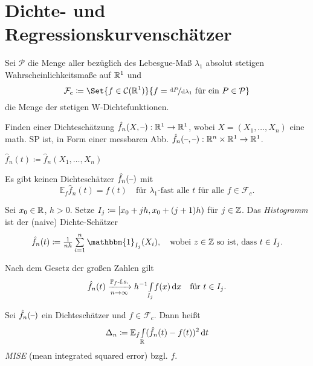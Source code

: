 \documentclass{cheat-sheet}
\renewcommand{\P}{\mathbb{P}} %
\newcommand{\E}{\mathbb{E}} %
\newcommand{\ind}{\mathbbm{1}} %
\newcommand{\Cont}{\mathcal{C}} %
\begin{document}

\iffalse

\section{Dichte- und Regressionskurvenschätzer}


\begin{nota}
  Sei $\mathcal{P}$ die Menge aller bezüglich des Lebesgue-Maß $\lambda_1$ absolut stetigen Wahrscheinlichkeitsmaße auf $\mathbb{R}^1$ und
  \[ \mathcal{F}_c \coloneqq \Set{f \in \Cont(\R^1)}{f = \nicefrac{\d P}{\d \lambda_1} \text{ für ein } P \in \mathcal{P}} \]
  die Menge der stetigen W-Dichtefunktionen.
\end{nota}

\begin{ziel}
  Finden einer Dichteschätzung $\hat{f}_n(X, \text{--}) : \mathbb{R}^1 \to \mathbb{R}^1$, wobei $X = (X_1, \ldots, X_n)$ eine math. SP ist, in Form einer messbaren Abb. $\hat{f}_n(\text{--}, \text{--}) : \mathbb{R}^n \times \mathbb{R}^1 \to \mathbb{R}^1$.
\end{ziel}

\begin{nota}
  $\hat{f}_n(t) \coloneqq \hat{f}_n(X_1, \ldots, X_n)$
\end{nota}

\begin{lem}
  Es gibt keinen Dichteschätzer $\hat{f}_n(\text{--})$ mit
  \[
    \E_f \hat{f}_n(t) = f(t) \quad
    \text{für $\lambda_1$-fast alle $t$ für alle $f \in \mathcal{F}_c$.}
  \]
\end{lem}

\begin{defn}
  Sei $x_0 \in \mathbb{R}$, $h > 0$.
  Setze $I_j \coloneqq \left[ x_0 + jh, x_0 + (j+1) h \right)$ für $j \in \mathbb{Z}$.
  Das \emph{Histogramm} ist der (naive) Dichte-Schätzer
  \[
    \hat{f}_n(t) \coloneqq \tfrac{1}{nh} \sum_{i=1}^n \ind_{I_j}(X_i), \quad
    \text{wobei $z \in \Z$ so ist, dass $t \in I_j$}.
  \]
\end{defn}

\begin{bem}
  Nach dem Gesetz der großen Zahlen gilt
  \[
    \hat{f}_n(t) \xra[n \to \infty]{\text{$\P_f$-f.s.}}
    h^{-1} \Int{I_j}{}{f(x)}{x} \quad
    \text{für $t \in I_j$.}
  \]
\end{bem}

\begin{defn}
  Sei $\hat{f}_n(\text{--})$ ein Dichteschätzer und $f \in \mathcal{F}_c$.
  Dann heißt
  \[
    \Delta_n \coloneqq \E_f \Int{\R}{}{(\hat{f}_n(t) - f(t))^2}{t}
  \]
  \emph{MISE} (mean integrated squared error) bzgl. $f$.
\end{defn}
\end{document}

